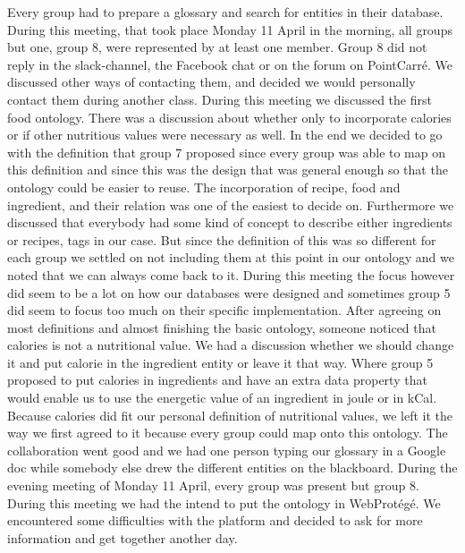 Every group had to prepare a glossary and search for entities in their database. During this meeting, that took place Monday 11 April in the morning, all groups but one, group 8, were represented by at least one member. Group 8 did not reply in the slack-channel, the Facebook chat or on the forum on PointCarr\'e. We discussed other ways of contacting them, and decided we would personally contact them during another class. During this meeting we discussed the first food ontology. There was a discussion about whether only to incorporate calories or if other nutritious values were necessary as well. In the end we decided to go with the definition that group 7 proposed since every group was able to map on this definition and since this was the design that was general enough so that the ontology could be easier to reuse. The incorporation of recipe, food and ingredient, and their relation was one of the easiest to decide on. Furthermore we discussed that everybody had some kind of concept to describe either ingredients or recipes, tags in our case. But since the definition of this was so different for each group we settled on not including them at this point in our ontology and we noted that we can always come back to it. During this meeting the focus however did seem to be a lot on how our databases were designed and sometimes group 5 did seem to focus too much on their specific implementation. After agreeing on most definitions and almost finishing the basic ontology, someone noticed that calories is not a nutritional value. We had a discussion whether we should change it and put calorie in the ingredient entity or leave it that way. Where group 5 proposed to put calories in ingredients and have an extra data property that would enable us to use the energetic value of an ingredient in joule or in kCal. Because calories did fit our personal definition of nutritional values, we left it the way we first agreed to it because every group could map onto this ontology. The collaboration went good and we had one person typing our glossary in a Google doc while somebody else drew the different entities on the blackboard. 
\newline
\newline
\noindent
During the evening meeting of Monday 11 April, every group was present but group 8. During this meeting we had the intend to put the ontology in  WebProtégé. We encountered some difficulties with the platform and decided to ask for more information and get together another day. 
\newline
\newline
